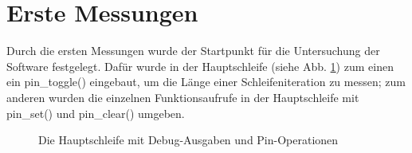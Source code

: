 \section{Erste Messungen}
Durch die ersten Messungen wurde der Startpunkt für die Untersuchung der Software
festgelegt. Dafür wurde in der Hauptschleife (siehe Abb. \ref{main_loop_full}) zum einen
ein pin\_toggle() eingebaut, um die Länge einer Schleifeniteration zu messen; zum anderen
wurden die einzelnen Funktionsaufrufe in der Hauptschleife mit pin\_set() und pin\_clear()
umgeben.
\begin{figure}[htb]
 \centering
 \caption{\label{main_loop_full}Die Hauptschleife mit Debug-Ausgaben und Pin-Operationen}
\end{figure}
